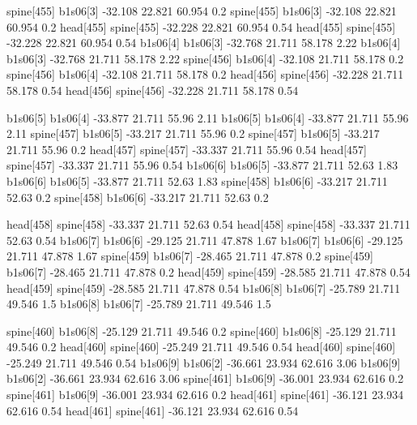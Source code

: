 spine[455]    b1s06[3]    -32.108    22.821    60.954    0.2
spine[455]    b1s06[3]    -32.108    22.821    60.954    0.2
head[455]    spine[455]    -32.228    22.821    60.954    0.54
head[455]    spine[455]    -32.228    22.821    60.954    0.54
b1s06[4]    b1s06[3]    -32.768    21.711    58.178    2.22
b1s06[4]    b1s06[3]    -32.768    21.711    58.178    2.22
spine[456]    b1s06[4]    -32.108    21.711    58.178    0.2
spine[456]    b1s06[4]    -32.108    21.711    58.178    0.2
head[456]    spine[456]    -32.228    21.711    58.178    0.54
head[456]    spine[456]    -32.228    21.711    58.178    0.54


b1s06[5]    b1s06[4]    -33.877    21.711    55.96    2.11
b1s06[5]    b1s06[4]    -33.877    21.711    55.96    2.11
spine[457]    b1s06[5]    -33.217    21.711    55.96    0.2
spine[457]    b1s06[5]    -33.217    21.711    55.96    0.2
head[457]    spine[457]    -33.337    21.711    55.96    0.54
head[457]    spine[457]    -33.337    21.711    55.96    0.54
b1s06[6]    b1s06[5]    -33.877    21.711    52.63    1.83
b1s06[6]    b1s06[5]    -33.877    21.711    52.63    1.83
spine[458]    b1s06[6]    -33.217    21.711    52.63    0.2
spine[458]    b1s06[6]    -33.217    21.711    52.63    0.2


head[458]    spine[458]    -33.337    21.711    52.63    0.54
head[458]    spine[458]    -33.337    21.711    52.63    0.54
b1s06[7]    b1s06[6]    -29.125    21.711    47.878    1.67
b1s06[7]    b1s06[6]    -29.125    21.711    47.878    1.67
spine[459]    b1s06[7]    -28.465    21.711    47.878    0.2
spine[459]    b1s06[7]    -28.465    21.711    47.878    0.2
head[459]    spine[459]    -28.585    21.711    47.878    0.54
head[459]    spine[459]    -28.585    21.711    47.878    0.54
b1s06[8]    b1s06[7]    -25.789    21.711    49.546    1.5
b1s06[8]    b1s06[7]    -25.789    21.711    49.546    1.5


spine[460]    b1s06[8]    -25.129    21.711    49.546    0.2
spine[460]    b1s06[8]    -25.129    21.711    49.546    0.2
head[460]    spine[460]    -25.249    21.711    49.546    0.54
head[460]    spine[460]    -25.249    21.711    49.546    0.54
b1s06[9]    b1s06[2]    -36.661    23.934    62.616    3.06
b1s06[9]    b1s06[2]    -36.661    23.934    62.616    3.06
spine[461]    b1s06[9]    -36.001    23.934    62.616    0.2
spine[461]    b1s06[9]    -36.001    23.934    62.616    0.2
head[461]    spine[461]    -36.121    23.934    62.616    0.54
head[461]    spine[461]    -36.121    23.934    62.616    0.54


